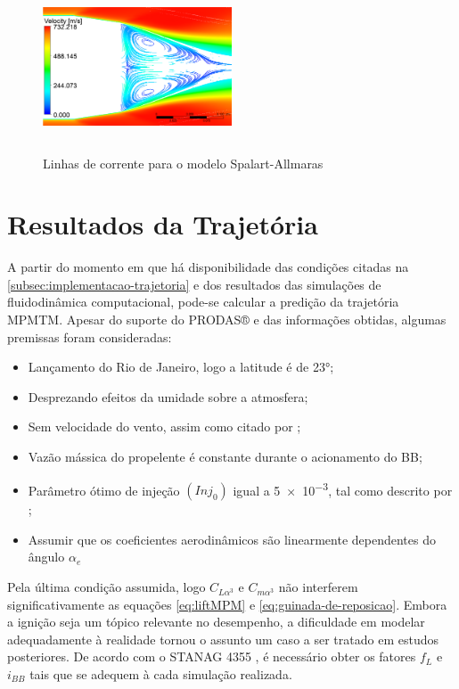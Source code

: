 \begin{figure}[!ht]
    \centering
    \includegraphics[height=5cm,width=0.5\textwidth]{corrente-velocidade-SPALART-2pol.png}
 	\caption{Linhas de corrente para o modelo Spalart-Allmaras}
    \label{fig:corrente-velocidade-bb-RANS}
\end{figure}

\section{Resultados da Trajetória}\label{sec:resultados-trajetoria}

A partir do momento em que há disponibilidade das condições citadas na \autoref{subsec:implementacao-trajetoria} e dos resultados das simulações de fluidodinâmica computacional, pode-se calcular a predição da trajetória MPMTM. Apesar do suporte do PRODAS® e das informações obtidas, algumas premissas foram consideradas:

\begin{itemize}
    \item Lançamento do Rio de Janeiro, logo a latitude é de \ang{23};
    \item Desprezando efeitos da umidade sobre a atmosfera;
    \item Sem velocidade do vento, assim como citado por \citeauthor{Rosendo2020};
    \item Vazão mássica do propelente é constante durante o acionamento do BB;
    \item Parâmetro ótimo de injeção \(\left(Inj_{0}\right)\) igual a \num{5e-3}, tal como descrito por \citeauthor{DAVENAS1993329};
    \item Assumir que os coeficientes aerodinâmicos são linearmente dependentes do ângulo \(\alpha_{e}\)
\end{itemize}

Pela última condição assumida, logo \(C_{L\alpha^{3}}\) e \(C_{m\alpha^{3}}\) não interferem significativamente as equações \ref{eq:liftMPM} e \ref{eq:guinada-de-reposicao}. Embora a ignição seja um tópico relevante no desempenho, a dificuldade em modelar adequadamente à realidade tornou o assunto um caso a ser tratado em estudos posteriores.
De acordo com o STANAG 4355 \cite{stanag4355}, é necessário obter os fatores \(f_{L}\) e \(i_{BB}\) tais que se adequem à cada simulação realizada. 

